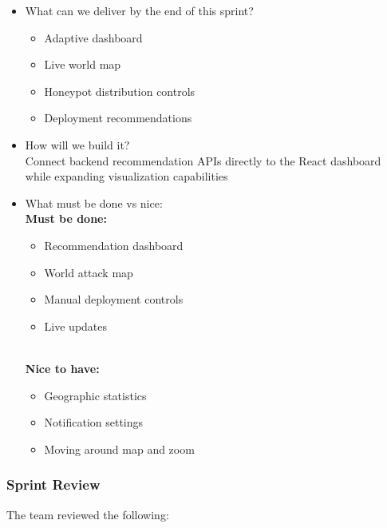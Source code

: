 \documentclass{article}
\begin{document}
\begin{itemize}
    \item What can we deliver by the end of this sprint? 
    \begin{itemize}
    \item Adaptive dashboard
    \item Live world map
    \item Honeypot distribution controls
    \item Deployment recommendations
    \end{itemize}
   
    \item How will we build it?
    \\Connect backend recommendation APIs directly to the React dashboard while expanding visualization capabilities
  
    \item What must be done vs nice:
    \\\textbf{Must be done:}
    \begin{itemize}
    \item Recommendation dashboard
    \item World attack map
    \item Manual deployment controls
    \item Live updates
    \end{itemize}

    \\\textbf{Nice to have:}
    \begin{itemize}
\item Geographic statistics
\item Notification settings
\item Moving around map and zoom

\end{itemize}

\end{itemize}

\subsubsection{Sprint Review}
The team reviewed the following:
\end{document}
